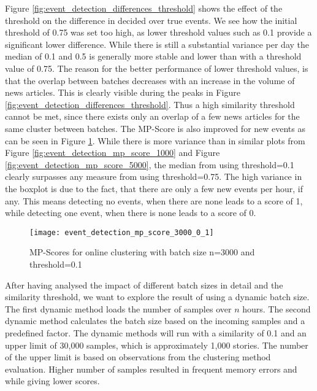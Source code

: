 Figure \ref{fig:event_detection_differences_threshold}
shows the effect of the threshold on the difference in decided over true events.
We see how the initial threshold of 0.75 was set too high,
as lower threshold values such as 0.1 provide a significant lower difference.
While there is still a substantial variance per day the median of 0.1 and 0.5
is generally more stable and lower than with a threshold value of 0.75.
The reason for the better performance of lower threshold values,
is that the overlap between batches decreases with an increase in the volume of news articles.
This is clearly visible during the peaks in Figure \ref{fig:event_detection_differences_threshold}.
Thus a high similarity threshold cannot be met,
since there exists only an overlap of a few news articles for the same cluster between batches.
The MP-Score is also improved for new events as can be seen in Figure \ref{fig:event_detection_mp_score_3000_0_1}.
While there is more variance than in similar plots from Figure \ref{fig:event_detection_mp_score_1000}
and Figure \ref{fig:event_detection_mp_score_5000},
the median from using threshold=0.1 clearly surpasses any measure from using threshold=0.75.
The high variance in the boxplot is due to the fact, that there are only a few new events per hour, if any.
This means detecting no events, when there are none leads to a score of 1,
while detecting one event, when there is none leads to a score of 0.

\begin{figure}[h]
    \centering
    \texttt{[image: event\_detection\_mp\_score\_3000\_0\_1]}
    \caption{MP-Scores for online clustering with batch size n=3000 and threshold=0.1}
    \label{fig:event_detection_mp_score_3000_0_1}
\end{figure}

After having analysed the impact of different batch sizes in detail and the similarity threshold,
we want to explore the result of using a dynamic batch size.
The first dynamic method loads the number of samples over $n$ hours.
The second dynamic method calculates the batch size based on the incoming samples and a predefined factor.
The dynamic methods will run with a similarity of 0.1 and an upper limit of 30,000 samples,
which is approximately 1,000 stories.
The number of the upper limit is based on observations from the clustering method evaluation.
Higher number of samples resulted in frequent memory errors and while giving lower scores.

